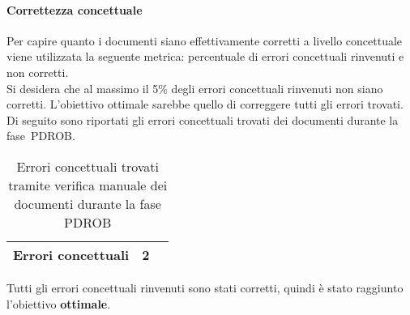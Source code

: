 \documentclass[../PianoDiQualifica.tex]{subfiles}
\begin{document}
\begin{appendices}
			\paragraph{Correttezza concettuale}
			Per capire quanto i documenti siano effettivamente corretti a livello concettuale viene utilizzata la seguente metrica: percentuale di errori concettuali rinvenuti e non corretti.\\
			Si desidera che al massimo il 5\% degli errori concettuali rinvenuti non siano corretti. L'obiettivo ottimale sarebbe quello di correggere tutti gli errori trovati. \\
			Di seguito sono riportati gli errori concettuali trovati dei documenti durante la fase\g\ PDROB.
			\begin{table}[H]
				\centering
				\begin{tabular}{l * {2}{c}}
					\midrule
					Errori concettuali & 2 \\
					\midrule
				\end{tabular}
				\caption{Errori concettuali trovati tramite verifica manuale dei documenti durante la fase PDROB}
				\label{tab:errori_concettuali}
			\end{table}
			Tutti gli errori concettuali rinvenuti sono stati corretti, quindi è stato raggiunto l'obiettivo \textbf{ottimale}.
			
\end{appendices}
\end{document}
